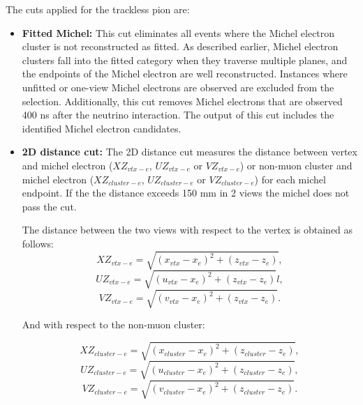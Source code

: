 The cuts applied for the trackless pion are:

\begin{itemize}
    \item \textbf{Fitted Michel:} This cut eliminates all events where the Michel electron cluster is not reconstructed as fitted. As described earlier, Michel electron clusters fall into the fitted category when they traverse multiple planes, and the endpoints of the Michel electron are well reconstructed. Instances where unfitted or one-view Michel electrons are observed are excluded from the selection. Additionally, this cut removes Michel electrons that are observed 400 ns after the neutrino interaction. The output of this cut includes the identified Michel electron candidates.

    \item \textbf{2D distance cut:} The 2D distance cut measures the distance between vertex and michel electron ($XZ_{vtx-e}$, $UZ_{vtx-e}$ or $VZ_{vtx-e}$) or non-muon cluster  and michel electron ($XZ_{cluster-e}$, $UZ_{cluster-e}$ or $VZ_{cluster-e}$) for each michel endpoint. If the the distance exceeds 150 mm in 2 views the michel does not pass the cut. 
    
    The distance between the two views with respect to the vertex is obtained as follows: \begin{equation}
        XZ_{vtx-e} = \sqrt{(x_{vtx}-x_e)^2 + (z_{vtx}-z_e)},
    \end{equation}
        \begin{equation}
        UZ_{vtx-e} = \sqrt{(u_{vtx}-x_e)^2 + (z_{vtx}-z_e)}l,
    \end{equation}
        \begin{equation}
        VZ_{vtx-e} = \sqrt{(v_{vtx}-x_e)^2 + (z_{vtx}-z_e)}.
    \end{equation}

    And with respect to the non-muon cluster:

    \begin{equation}
        XZ_{cluster-e} = \sqrt{(x_{cluster}-x_e)^2 + (z_{cluster}-z_e)},
    \end{equation}
        \begin{equation}
        UZ_{cluster-e} = \sqrt{(u_{cluster}-x_e)^2 + (z_{cluster}-z_e)},
    \end{equation}
        \begin{equation}
        VZ_{cluster-e} = \sqrt{(v_{cluster}-x_e)^2 + (z_{cluster}-z_e)}.
    \end{equation}


\end{itemize}
